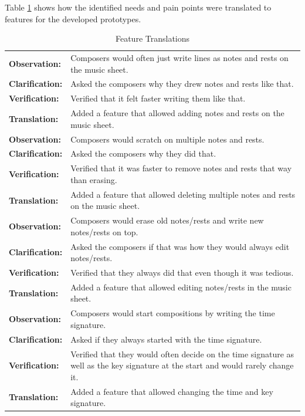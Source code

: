 		Table \ref{tab:feature-translations} shows how the identified needs and pain points were translated to features for the developed prototypes.

		\begin{longtable}{|p{2.5cm} p{12.5cm}|}
			\caption{Feature Translations} \label{tab:feature-translations} \\ 
		  	\hline

		  	\textbf{Observation:} 	& Composers would often just write lines as notes and rests on the music sheet. \\
		  	\textbf{Clarification:} 	& Asked the composers why they drew notes and rests like that. \\
		  	\textbf{Verification:} 	& Verified that it felt faster writing them like that. \\
		  	\textbf{Translation:} 	& Added a feature that allowed adding notes and rests on the music sheet. \\
		  	\hline

		  	\textbf{Observation:} 	& Composers would scratch on multiple notes and rests. \\
		  	\textbf{Clarification:} 	& Asked the composers why they did that. \\
		  	\textbf{Verification:} 	& Verified that it was faster to remove notes and rests that way than erasing. \\
		  	\textbf{Translation:} 	& Added a feature that allowed deleting multiple notes and rests on the music sheet. \\
		  	\hline

		  	\textbf{Observation:} 	& Composers would erase old notes/rests and write new notes/rests on top. \\
		  	\textbf{Clarification:} 	& Asked the composers if that was how they would always edit notes/rests. \\
		  	\textbf{Verification:} 	& Verified that they always did that even though it was tedious. \\
		  	\textbf{Translation:} 	& Added a feature that allowed editing notes/rests in the music sheet. \\
		  	\hline

		  	\textbf{Observation:} 	& Composers would start compositions by writing the time signature. \\
		  	\textbf{Clarification:} 	& Asked if they always started with the time signature. \\
		  	\textbf{Verification:} 	& Verified that they would often decide on the time signature as well as the key signature at the start and would rarely change it. \\
		  	\textbf{Translation:} 	& Added a feature that allowed changing the time and key signature. \\
		  	\hline


\end{longtable}
